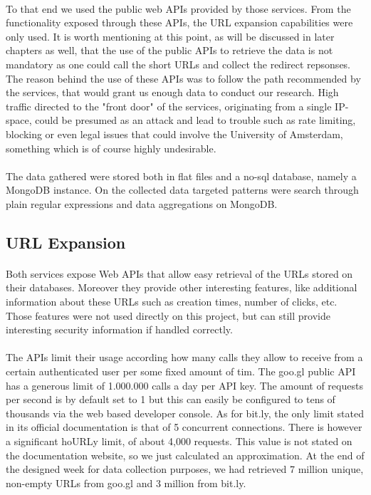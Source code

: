 \documentclass[12pt]{article}
\begin{document}
\paragraph{}
To that end we used the public web APIs provided by those services. From the functionality exposed through these APIs, the URL expansion capabilities were only used. It is worth mentioning at this point, as will be discussed in later chapters as well, that the use of the public APIs to retrieve the data is not mandatory as one could call the short URLs and collect the redirect repsonses. The reason behind the use of these APIs was to follow the path recommended by the services, that would grant us enough data to conduct our research. High traffic directed to the "front door" of the services, originating from a single IP-space, could be presumed as an attack and lead to trouble such as rate limiting, blocking or even legal issues that could involve the University of Amsterdam, something which is of course highly undesirable. 

\paragraph{}
The data gathered were stored both in flat files and a no-sql database, namely a MongoDB instance. On the collected data targeted patterns were search through plain regular expressions and data aggregations on MongoDB. 

\subsection{URL Expansion}

\paragraph{}
Both services expose Web APIs that allow easy retrieval of the URLs stored on their databases. Moreover they provide other interesting features, like additional information about these URLs such as creation times, number of clicks, etc. Those features were not used directly on this project, but can still provide interesting security information if handled correctly. 

\paragraph{}
The APIs limit their usage according how many calls they allow to receive from a certain authenticated user per some fixed amount of tim. The goo.gl public API has a generous limit of 1.000.000 calls a day per API key. The amount of requests per second is by default set to 1 but this can easily be configured to tens of thousands via the web based developer console. As for bit.ly, the only limit stated in its official documentation is that of 5 concurrent connections. There is however a significant hoURLy limit, of  about 4,000 requests. This value is not stated on the documentation website, so we just calculated an approximation. At the end of the designed week for data collection purposes, we had retrieved 7 million unique, non-empty URLs from goo.gl and 3 million from bit.ly.
\end{document}

